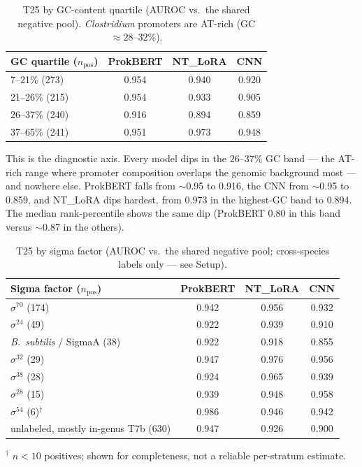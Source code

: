 \documentclass{article}
\begin{document}
\begin{table}[h]
\centering
\caption{T25 by GC-content quartile (AUROC vs.\ the shared negative pool). \emph{Clostridium} promoters are AT-rich (GC $\approx 28$--$32\%$).}
\begin{tabular}{lccc}
\toprule
GC quartile ($n_{\text{pos}}$) & ProkBERT & NT\_LoRA & CNN \\
\midrule
7--21\% (273)  & 0.954 & 0.940 & 0.920 \\
21--26\% (215) & 0.954 & 0.933 & 0.905 \\
26--37\% (240) & 0.916 & 0.894 & 0.859 \\
37--65\% (241) & 0.951 & 0.973 & 0.948 \\
\bottomrule
\end{tabular}
\end{table}

This is the diagnostic axis. Every model dips in the $26$--$37\%$ GC band --- the AT-rich range where promoter composition overlaps the genomic background most --- and nowhere else. ProkBERT falls from $\sim$0.95 to 0.916, the CNN from $\sim$0.95 to 0.859, and NT\_LoRA dips hardest, from 0.973 in the highest-GC band to 0.894. The median rank-percentile shows the same dip (ProkBERT 0.80 in this band versus $\sim$0.87 in the others).

\begin{table}[h]
\centering
\caption{T25 by sigma factor (AUROC vs.\ the shared negative pool; cross-species labels only --- see Setup).}
\begin{tabular}{lccc}
\toprule
Sigma factor ($n_{\text{pos}}$) & ProkBERT & NT\_LoRA & CNN \\
\midrule
$\sigma^{70}$ (174) & 0.942 & 0.956 & 0.932 \\
$\sigma^{24}$ (49)  & 0.922 & 0.939 & 0.910 \\
\emph{B.\ subtilis} / SigmaA (38) & 0.922 & 0.918 & 0.855 \\
$\sigma^{32}$ (29)  & 0.947 & 0.976 & 0.956 \\
$\sigma^{38}$ (28)  & 0.924 & 0.965 & 0.939 \\
$\sigma^{28}$ (15)  & 0.939 & 0.948 & 0.958 \\
$\sigma^{54}$ (6)$^{\dagger}$ & 0.986 & 0.946 & 0.942 \\
unlabeled, mostly in-genus T7b (630) & 0.947 & 0.926 & 0.900 \\
\bottomrule
\end{tabular}

{\footnotesize $^{\dagger}$ $n<10$ positives; shown for completeness, not a reliable per-stratum estimate.}
\end{table}
\end{document}
